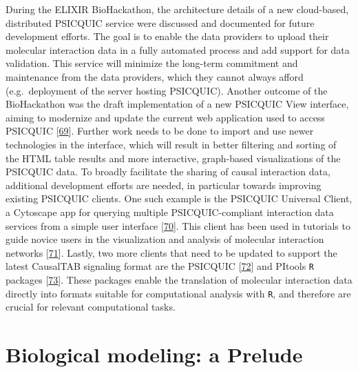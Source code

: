 \documentclass[
  12pt,
]{book}
\begin{document}
During the ELIXIR BioHackathon, the architecture details of a new cloud-based, distributed PSICQUIC service were discussed and documented for future development efforts.
The goal is to enable the data providers to upload their molecular interaction data in a fully automated process and add support for data validation.
This service will minimize the long-term commitment and maintenance from the data providers, which they cannot always afford (e.g.~deployment of the server hosting PSICQUIC).
Another outcome of the BioHackathon was the draft implementation of a new PSICQUIC View interface, aiming to modernize and update the current web application used to access PSICQUIC {[}\protect\hyperlink{ref-psicquic-view}{69}{]}.
Further work needs to be done to import and use newer technologies in the interface, which will result in better filtering and sorting of the HTML table results and more interactive, graph-based visualizations of the PSICQUIC data.
To broadly facilitate the sharing of causal interaction data, additional development efforts are needed, in particular towards improving existing PSICQUIC clients.
One such example is the PSICQUIC Universal Client, a Cytoscape app for querying multiple PSICQUIC-compliant interaction data services from a simple user interface {[}\protect\hyperlink{ref-PSICQUICUniversalClient}{70}{]}.
This client has been used in tutorials to guide novice users in the visualization and analysis of molecular interaction networks {[}\protect\hyperlink{ref-Millan2013}{71}{]}.
Lastly, two more clients that need to be updated to support the latest CausalTAB signaling format are the PSICQUIC {[}\protect\hyperlink{ref-Shannon2020}{72}{]} and PItools \texttt{R} packages {[}\protect\hyperlink{ref-Kleshchevnikov2021}{73}{]}.
These packages enable the translation of molecular interaction data directly into formats suitable for computational analysis with \texttt{R}, and therefore are crucial for relevant computational tasks.

\newpage

\hypertarget{biological-modeling-a-prelude}{%
\section*{Biological modeling: a Prelude}\label{biological-modeling-a-prelude}}

\indent
\end{document}
